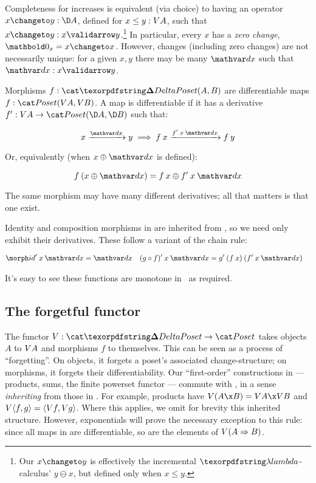 \noindent Completeness for increases is equivalent (via choice) to having an
operator $x \changeto y : \chgs A$, defined for $x \le y : V A$, such that
$\valid{x \changeto y} x y$.\footnote{Our $x \changeto y$ is effectively the
  incremental $\fn$-calculus' $y \ominus x$, but defined only when $x \le y$.}
In particular, every $x$ has a \emph{zero change}, $\zero_x = x \changeto x$.
However, changes (including zero changes) are not necessarily unique: for a
given $x,y$ there may be many $\dx$ such that $\valid\dx x y$.

Morphisms $f : \CP(A, B)$ are differentiable maps $f : \Poset(\vals A, \vals
B)$. A map is differentiable if it has a derivative $\deriv f : \vals A \to
\Poset(\chgs A, \chgs B)$ such that:

\nopagebreak[2]
\[ \vld{\dx} x y \implies \vld{\deriv f\<x\<\dx}{f\<x}{f\<y}\]

\noindent Or, equivalently (when $x \upd \dx$ is defined):

\nopagebreak[2]
\[ f\<(x \upd \dx) = f\<x \upd \deriv f\<x\<\dx \]

\noindent
The same morphism may have many different derivatives; all that matters is that
one exist.

Identity and composition morphisms in \CP{} are inherited from \Poset{}, so we
need only exhibit their derivatives. These follow a variant of the chain rule:

\nopagebreak[2]
\begin{align*}
  \deriv\id \<x\<\dx &= \dx
  & \deriv{(g \circ f)} \<x\<\dx &= \deriv g \<(f\<x) \<(\deriv f\<x\<\dx)
\end{align*}

\noindent
It's easy to see these functions are monotone in \dx\ as required.


\subsection{The forgetful functor \valfn}

The functor $\valfn : \CP \to \Poset$ takes objects $A$ to $V A$ and
morphisms $f$ to themselves. This can be seen as a process of ``forgetting''. On
objects, it forgets a poset's associated change-structure; on morphisms, it
forgets their differentiability.
%
Our ``first-order'' constructions in \CP{} --- products, sums, the finite
powerset functor --- commute with \valfn, in a sense \emph{inheriting} from
those in \Poset. For example, products have $\vals{(A \x B)} = \vals A \x \vals
B$ and $V{\langle{f,g}\rangle} = \langle{\ensuremath{V}f, \ensuremath{V}g}\rangle$.
%
Where this applies, we omit for brevity this inherited structure.
%
However, exponentials will prove the necessary exception to this rule: since all
maps in \CP{} are differentiable, so are the elements of $V{(A \Rightarrow B)}$.

